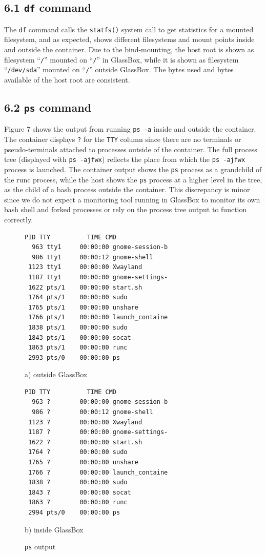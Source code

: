 \documentclass{proc}
\begin{document}
\subsection*{6.1 \texttt{df} command}
The \texttt{df} command calls the \texttt{statfs()} system call to get statistics for a mounted filesystem, and as expected, shows different filesystems and mount points inside and outside the container. Due to the bind-mounting, the host root is shown as filesystem ``\texttt{/}'' mounted on ``\texttt{/}'' in GlassBox, while it is shown as filesystem ``\texttt{/dev/sda}'' mounted on ``\texttt{/}'' outside GlassBox. The bytes used and bytes available of the host root are consistent.
\subsection*{6.2 \texttt{ps} command}
Figure 7 shows the output from running \texttt{ps -a} inside and outside the container. The container displays \texttt{?} for the \texttt{TTY} column since there are no terminals or pseudo-terminals attached to processes outside of the container. The full process tree (displayed with \texttt{ps -ajfwx}) reflects the place from which the \texttt{ps -ajfwx} process is launched. The container output shows the \texttt{ps} process as a grandchild of the runc process, while the host shows the \texttt{ps} process at a higher level in the tree, as the child of a bash process outside the container. This discrepancy is minor since we do not expect a monitoring tool running in GlassBox to monitor its own bash shell and forked processes or rely on the process tree output to function correctly.
 \begin{figure}[h]
\begin{lstlisting}[linewidth=\linewidth]
  PID TTY          TIME CMD
  963 tty1     00:00:00 gnome-session-b
  986 tty1     00:00:12 gnome-shell
 1123 tty1     00:00:00 Xwayland
 1187 tty1     00:00:00 gnome-settings-
 1622 pts/1    00:00:00 start.sh
 1764 pts/1    00:00:00 sudo
 1765 pts/1    00:00:00 unshare
 1766 pts/1    00:00:00 launch_containe
 1838 pts/1    00:00:00 sudo
 1843 pts/1    00:00:00 socat
 1863 pts/1    00:00:00 runc
 2993 pts/0    00:00:00 ps
 \end{lstlisting}
\hspace{7.5em} a) outside GlassBox
 \begin{lstlisting}[linewidth=\linewidth]
  PID TTY          TIME CMD
  963 ?        00:00:00 gnome-session-b
  986 ?        00:00:12 gnome-shell
 1123 ?        00:00:00 Xwayland
 1187 ?        00:00:00 gnome-settings-
 1622 ?        00:00:00 start.sh
 1764 ?        00:00:00 sudo
 1765 ?        00:00:00 unshare
 1766 ?        00:00:00 launch_containe
 1838 ?        00:00:00 sudo
 1843 ?        00:00:00 socat
 1863 ?        00:00:00 runc
 2994 pts/0    00:00:00 ps
\end{lstlisting}
\hspace{7.5em} b) inside GlassBox
 \caption{\texttt{ps} output}
\end{figure}
\end{document}
